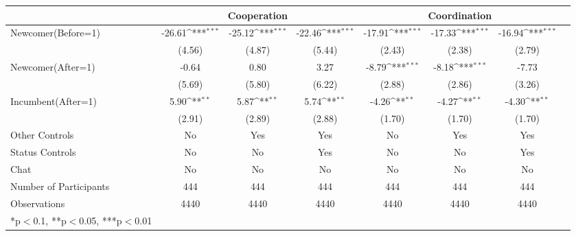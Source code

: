{\tiny
\def\sym#1{\ifmmode^{#1}\else\(^{#1}\)\fi}
\begin{tabular}{l*{7}{c}}
\toprule
          & \multicolumn{3}{c}{Cooperation}   &\multicolumn{3}{c}{Coordination}     \\
\midrule
Newcomer(Before=1)  & -26.61\sym{***}  &    -25.12\sym{***}  &  -22.46\sym{***}   &     -17.91\sym{***}    &    -17.33\sym{***}  &  -16.94\sym{***}   \\
&     (4.56)             &     (4.87)  &  (5.44)   &     (2.43)             &     (2.38)          &  (2.79)       \\
\addlinespace
Newcomer(After=1)  &     -0.64  &     0.80   &  3.27   &     -8.79\sym{***}     &     -8.18\sym{***}   &  -7.73  \\
                 & (5.69)   &   (5.80)  &  (6.22)    &     (2.88)             &     (2.86)           &  (3.26) \\
\addlinespace
Incumbent(After=1)   & 5.90\sym{**}  &  5.87\sym{**}  &  5.74\sym{**}   &     -4.26\sym{**}      &     -4.27\sym{**}  &  -4.30\sym{**}    \\
         &     (2.91) &     (2.89)   &  (2.88)  &     (1.70)             &     (1.70)         &  (1.70)    \\

\midrule
Other Controls   &    No &    Yes &    Yes    &    No  &    Yes &    Yes             \\
Status Controls &    No  &    No    &    Yes    &    No  &    No    &    Yes           \\
Chat          &    No    &    No   &    No  &    No    &    No      &    No             \\
\midrule
Number of Participants &    444 &    444  &    444  &    444 &    444  &    444     \\
\midrule
Observations          &  4440  & 4440  &  4440  &  4440  & 4440  &  4440            \\
\bottomrule
*p$<$0.1, **p$<$0.05, ***p$<$0.01
\end{tabular}
}

